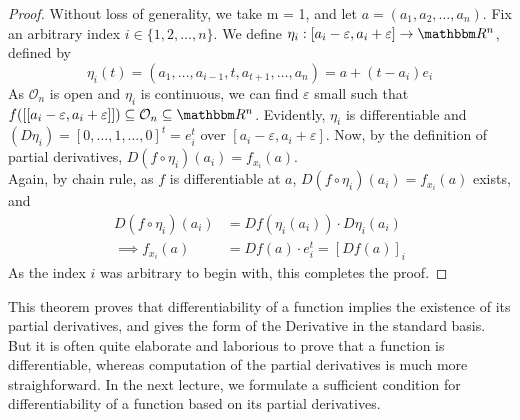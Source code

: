 \documentclass[../Analysis-3]{subfiles}
\begin{document}
\begin{proof}
  Without loss of generality, we take m = 1, and let $a = (a_1, a_2, \dots, a_n)$. Fix an arbitrary index $i \in \{1,2,\dots,n \}$. We define $\eta_i : [a_i - \varepsilon,a_i + \varepsilon] \to \R^n$, defined by 
  \[\eta_i(t) = (a_1, \dots, a_{i-1}, t, a_{t+1}, \dots, a_n) = a + (t-a_i)e_i \]
  As $\mathcal{O}_n$ is open and $\eta_i$ is continuous, we can find $\varepsilon$ small such that $f([[a_i - \varepsilon,a_i + \varepsilon]]) \subseteq \mathcal{O}_n \subseteq \R^n$. Evidently, $\eta_i$ is differentiable and $(D\eta_i) = [0,\dots,1,\dots,0]^t = e_i^t$ over $[a_i - \varepsilon,a_i + \varepsilon]$. Now, by the definition of partial derivatives, \(D(f\circ\eta_i)(a_i) = f_{x_i} (a)\).\\
  Again, by chain rule, as $f$ is differentiable at $a$, $D(f\circ\eta_i)(a_i) = f_{x_i}(a)$ exists, and 
  \begin{align*}
      D(f\circ\eta_i)(a_i) &= Df(\eta_i(a_i)) \cdot D\eta_i (a_i)\\
      \implies f_{x_i} (a) &= Df(a) \cdot e_i^t = [Df(a)]_i
  \end{align*}
  As the index $i$ was arbitrary to begin with, this completes the proof.

\end{proof}

This theorem proves that differentiability of a function implies the existence of its partial derivatives, and gives the form of the Derivative in the standard basis. But it is often quite elaborate and laborious to prove that a function is differentiable, whereas computation of the partial derivatives is much more straighforward. In the next lecture, we formulate a sufficient condition for differentiability of a function based on its partial derivatives.
\end{document}
